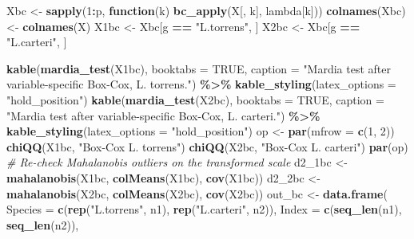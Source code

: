 \documentclass[
  11pt,
]{article}
\newenvironment{Shaded}{\begin{snugshade}}{\end{snugshade}}
\newcommand{\AttributeTok}[1]{\textcolor[rgb]{0.13,0.29,0.53}{#1}}
\newcommand{\CommentTok}[1]{\textcolor[rgb]{0.56,0.35,0.01}{\textit{#1}}}
\newcommand{\ConstantTok}[1]{\textcolor[rgb]{0.56,0.35,0.01}{#1}}
\newcommand{\ControlFlowTok}[1]{\textcolor[rgb]{0.13,0.29,0.53}{\textbf{#1}}}
\newcommand{\DecValTok}[1]{\textcolor[rgb]{0.00,0.00,0.81}{#1}}
\newcommand{\FunctionTok}[1]{\textcolor[rgb]{0.13,0.29,0.53}{\textbf{#1}}}
\newcommand{\NormalTok}[1]{#1}
\newcommand{\OtherTok}[1]{\textcolor[rgb]{0.56,0.35,0.01}{#1}}
\newcommand{\SpecialCharTok}[1]{\textcolor[rgb]{0.81,0.36,0.00}{\textbf{#1}}}
\newcommand{\StringTok}[1]{\textcolor[rgb]{0.31,0.60,0.02}{#1}}
\begin{document}
\begin{Shaded}
\begin{Highlighting}[]
\NormalTok{Xbc  }\OtherTok{\textless{}{-}} \FunctionTok{sapply}\NormalTok{(}\DecValTok{1}\SpecialCharTok{:}\NormalTok{p, }\ControlFlowTok{function}\NormalTok{(k) }\FunctionTok{bc\_apply}\NormalTok{(X[, k], lambda[k]))}
\FunctionTok{colnames}\NormalTok{(Xbc) }\OtherTok{\textless{}{-}} \FunctionTok{colnames}\NormalTok{(X)}
\NormalTok{X1bc }\OtherTok{\textless{}{-}}\NormalTok{ Xbc[g }\SpecialCharTok{==} \StringTok{"L.torrens"}\NormalTok{, ]}
\NormalTok{X2bc }\OtherTok{\textless{}{-}}\NormalTok{ Xbc[g }\SpecialCharTok{==} \StringTok{"L.carteri"}\NormalTok{, ]}

\FunctionTok{kable}\NormalTok{(}\FunctionTok{mardia\_test}\NormalTok{(X1bc), }\AttributeTok{booktabs =} \ConstantTok{TRUE}\NormalTok{,}
      \AttributeTok{caption =} \StringTok{"Mardia test after variable{-}specific Box{-}Cox, L. torrens."}\NormalTok{) }\SpecialCharTok{\%\textgreater{}\%}
  \FunctionTok{kable\_styling}\NormalTok{(}\AttributeTok{latex\_options =} \StringTok{"hold\_position"}\NormalTok{)}
\FunctionTok{kable}\NormalTok{(}\FunctionTok{mardia\_test}\NormalTok{(X2bc), }\AttributeTok{booktabs =} \ConstantTok{TRUE}\NormalTok{,}
      \AttributeTok{caption =} \StringTok{"Mardia test after variable{-}specific Box{-}Cox, L. carteri."}\NormalTok{) }\SpecialCharTok{\%\textgreater{}\%}
  \FunctionTok{kable\_styling}\NormalTok{(}\AttributeTok{latex\_options =} \StringTok{"hold\_position"}\NormalTok{)}
\NormalTok{op }\OtherTok{\textless{}{-}} \FunctionTok{par}\NormalTok{(}\AttributeTok{mfrow =} \FunctionTok{c}\NormalTok{(}\DecValTok{1}\NormalTok{, }\DecValTok{2}\NormalTok{))}
\FunctionTok{chiQQ}\NormalTok{(X1bc, }\StringTok{"Box{-}Cox  L. torrens"}\NormalTok{)}
\FunctionTok{chiQQ}\NormalTok{(X2bc, }\StringTok{"Box{-}Cox  L. carteri"}\NormalTok{)}
\FunctionTok{par}\NormalTok{(op)}
\CommentTok{\# Re{-}check Mahalanobis outliers on the transformed scale}
\NormalTok{d2\_1bc }\OtherTok{\textless{}{-}} \FunctionTok{mahalanobis}\NormalTok{(X1bc, }\FunctionTok{colMeans}\NormalTok{(X1bc), }\FunctionTok{cov}\NormalTok{(X1bc))}
\NormalTok{d2\_2bc }\OtherTok{\textless{}{-}} \FunctionTok{mahalanobis}\NormalTok{(X2bc, }\FunctionTok{colMeans}\NormalTok{(X2bc), }\FunctionTok{cov}\NormalTok{(X2bc))}
\NormalTok{out\_bc }\OtherTok{\textless{}{-}} \FunctionTok{data.frame}\NormalTok{(}
  \AttributeTok{Species =} \FunctionTok{c}\NormalTok{(}\FunctionTok{rep}\NormalTok{(}\StringTok{"L.torrens"}\NormalTok{, n1), }\FunctionTok{rep}\NormalTok{(}\StringTok{"L.carteri"}\NormalTok{, n2)),}
  \AttributeTok{Index   =} \FunctionTok{c}\NormalTok{(}\FunctionTok{seq\_len}\NormalTok{(n1), }\FunctionTok{seq\_len}\NormalTok{(n2)),}

\end{Highlighting}
\end{Shaded}
\end{document}

